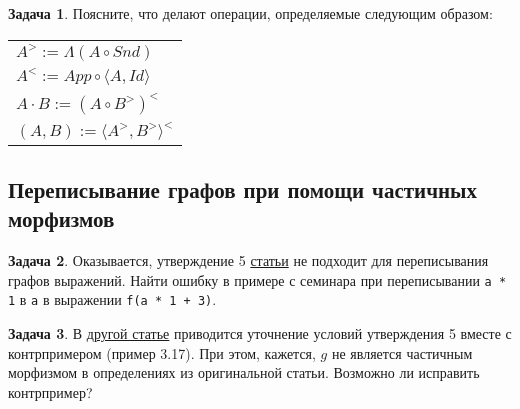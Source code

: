\documentclass[10pt]{article}
\theoremstyle{definition}
\newtheorem{Pm}{Задача}[subsection]
\begin{document}
\begin{Pm}
Поясните, что делают операции, определяемые следующим образом:
\vspace{0.3cm}

\begin{tabular}{l}
$A ^> := \Lambda(A \circ Snd)$\\
$A ^< := App \circ \langle A, Id \rangle$\\
$A \cdot B := (A \circ B^>)^<$\\
$(A,B) := \langle A^>, B^> \rangle ^<$
\end{tabular}
\end{Pm}

\subsection{Переписывание графов при помощи частичных морфизмов}

\begin{Pm}
Оказывается, утверждение 5 \href{https://www.sciencedirect.com/science/article/pii/0304397584900215}{статьи} не подходит для переписывания графов выражений. Найти ошибку в примере с семинара при переписывании \texttt{a * 1} в \texttt{a} в выражении \texttt{f(a * 1 + 3)}.
\end{Pm}

\begin{Pm}
В \href{https://repository.kulib.kyoto-u.ac.jp/dspace/bitstream/2433/82095/1/0754-28.pdf}{другой статье} приводится уточнение условий утверждения 5 вместе с контрпримером (пример 3.17). При этом, кажется, $g$ не является частичным морфизмом в определениях из оригинальной статьи. Возможно ли исправить контрпример?
\end{Pm}
\end{document}
